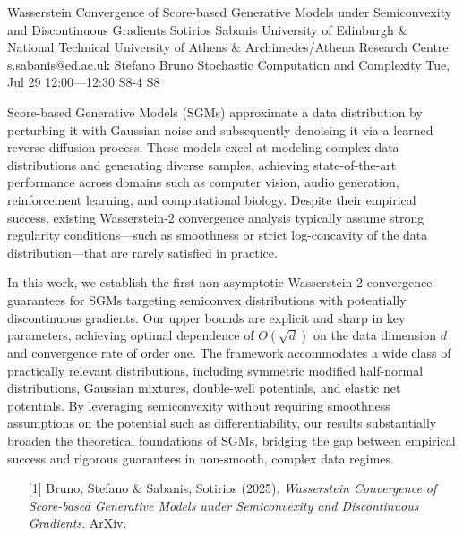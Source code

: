 \begin{talk}
  {Wasserstein Convergence of Score-based Generative Models under Semiconvexity and Discontinuous Gradients}%
  {Sotirios Sabanis}%
  {University of Edinburgh \& National Technical University of Athens \& Archimedes/Athena Research Centre}%
  {s.sabanis@ed.ac.uk}%
  {Stefano Bruno}%
  {Stochastic Computation and Complexity}%
  {Tue, Jul 29 12:00---12:30}%
  {S8-4}%
  {S8}%
    
   
\noindent Score-based Generative Models (SGMs) approximate a data distribution by perturbing it with Gaussian noise and subsequently denoising it via a learned reverse diffusion process. These models excel at modeling complex data distributions and generating diverse samples, achieving state-of-the-art performance across domains such as computer vision, audio generation, reinforcement learning, and computational biology. Despite their empirical success, existing Wasserstein-2 convergence analysis typically assume strong regularity conditions—such as smoothness or strict log-concavity of the data distribution—that are rarely satisfied in practice.
  
 \noindent In this work, we establish the first non-asymptotic Wasserstein-2 convergence guarantees for SGMs targeting semiconvex distributions with potentially discontinuous gradients. Our upper bounds are explicit and sharp in key parameters, achieving optimal dependence of $O(\sqrt{d})$ on the data dimension $d$ and convergence rate of order one. The framework accommodates a wide class of practically relevant distributions, including symmetric modified half-normal distributions, Gaussian mixtures, double-well potentials, and elastic net potentials. By leveraging semiconvexity without requiring smoothness assumptions on the potential such as differentiability, our results substantially broaden the theoretical foundations of SGMs, bridging the gap between empirical success and rigorous guarantees in non-smooth, complex data regimes.

\medskip


\begin{enumerate}
 \item[{[1]}] Bruno, Stefano \& Sabanis, Sotirios (2025). {\it Wasserstein Convergence of Score-based Generative Models under Semiconvexity and Discontinuous Gradients}. ArXiv.
\end{enumerate}


\end{talk}

